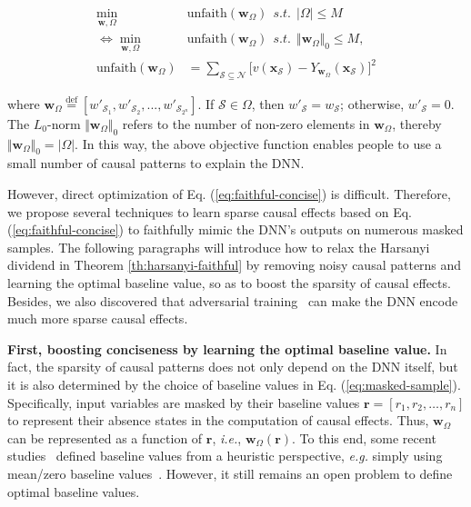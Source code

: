 \documentclass[10pt,twocolumn,letterpaper]{article}
\begin{document}
\begin{small}
\begin{equation}
\begin{aligned}
    {\min}_{\boldsymbol{w},\Omega}\ \ 
     &\mathrm{unfaith}(\boldsymbol{w}_{\Omega})
     \ \ 
     s.t.
     \ \ 
     |\Omega|\!\leq\! M
     \\
     \Leftrightarrow
     {\min}_{\boldsymbol{w},\Omega}\ \  &\mathrm{unfaith}(\boldsymbol{w}_{\Omega})
     \ \ 
     s.t.
     \ \ 
     \Vert\boldsymbol{w}_{\Omega}\Vert_0\!\leq\! M,
     \\
     \mathrm{unfaith}(\boldsymbol{w}_{\Omega})&={\sum}_{\mathcal{S}\subseteq \mathcal{N}}\Big[v(\boldsymbol{x}_{\mathcal{S}})-Y_{\boldsymbol{w}_{\Omega}}(\boldsymbol{x}_{\mathcal{S}})\Big]^2 \!
\label{eq:faithful-concise}
\end{aligned}
\end{equation}
\end{small}
\!\!where {\small$\boldsymbol{w}_{\Omega}\overset{\text{def}}{=}[w'_{\mathcal{S}_1},w'_{\mathcal{S}_2},...,w'_{\mathcal{S}_{2^n}}]$}.
If {\small$\mathcal{S}\in\Omega$}, then {\small$w'_{\mathcal{S}}\!=\!w_{\mathcal{S}}$}; otherwise, {\small$w'_{\mathcal{S}}\!=\!0$}.
The {\small$L_0$}-norm {\small$\Vert\boldsymbol{w}_{\Omega}\Vert_0$} refers to the number of non-zero elements in {\small$\boldsymbol{w}_{\Omega}$}, thereby {\small$\Vert\boldsymbol{w}_{\Omega}\Vert_0\!=\!|\Omega|$}.
In this way, the above objective function enables people to use a small number of causal patterns to explain the DNN.

However, direct optimization of Eq. (\ref{eq:faithful-concise}) is difficult.
Therefore, we propose several techniques to learn sparse causal effects based on Eq. (\ref{eq:faithful-concise}) to faithfully mimic the DNN's outputs on numerous masked samples.
The following paragraphs will introduce how to relax the Harsanyi dividend in Theorem \ref{th:harsanyi-faithful} by removing noisy causal patterns and learning the optimal baseline value, so as to boost the sparsity of causal effects.
Besides, we also discovered that adversarial training~\cite{madry2018towards} can make the DNN encode much more sparse causal effects.


\textbf{First, boosting conciseness by learning the optimal baseline value.}
In fact, the sparsity of causal patterns does not only depend on the DNN itself, but it is also determined by the choice of baseline values in Eq. (\ref{eq:masked-sample}).
Specifically, input variables are masked by their baseline values {\small $\boldsymbol{r}=[r_1,r_2,\ldots,r_n]$} to represent their absence states in the computation of causal effects.
Thus, {\small$\boldsymbol{w}_{\Omega}$} can be represented as a function of {\small$\boldsymbol{r}$}, \emph{i.e.}, {\small$\boldsymbol{w}_{\Omega}(\boldsymbol{r})$}.
To this end, some recent studies~\cite{ancona2019explaining,dabkowski2017real,ren2021learning} defined baseline values from a heuristic perspective, \emph{e.g.} simply using mean/zero baseline values~\cite{dabkowski2017real,sundararajan2017axiomatic}.
However, it still remains an open problem to define optimal baseline values.
\end{document}

